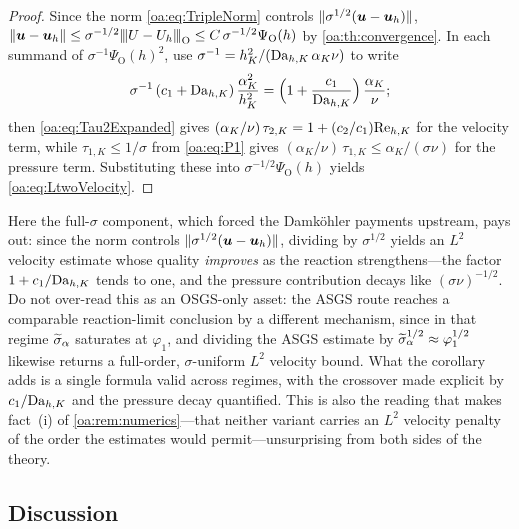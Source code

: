 \begin{proof}
Since the norm \cref{oa:eq:TripleNorm} controls $\lVert \sigma^{1/2}(\boldsymbol{u}-\boldsymbol{u}_h) \rVert$,
$\lVert \boldsymbol{u} - \boldsymbol{u}_h \rVert \le \sigma^{-1/2}{\lvert\kern-0.25ex\lvert\kern-0.25ex\lvert U - U_h \rvert\kern-0.25ex\rvert\kern-0.25ex\rvert}_{\mathrm{O}} \le
C\,\sigma^{-1/2}\Psi_{\mathrm O}(h)$ by \cref{oa:th:convergence}. In each summand of
$\sigma^{-1}\Psi_{\mathrm O}(h)^2$, use $\sigma^{-1} = h_K^2/(\mathrm{Da}_{h,K}\,\alpha_K\nu)$ to write
\[
  \sigma^{-1}\,(c_1+\mathrm{Da}_{h,K})\,\frac{\alpha_K^2}{h_K^2}
  = \Bigl(1 + \frac{c_1}{\mathrm{Da}_{h,K}}\Bigr)\,\frac{\alpha_K}{\nu};
\]
then \cref{oa:eq:Tau2Expanded} gives $(\alpha_K/\nu)\,\tau_{2,K} = 1 + (c_2/c_1)\mathrm{Re}_{h,K}$ for the
velocity term, while $\tau_{1,K} \le 1/\sigma$ from \cref{oa:eq:P1} gives
$(\alpha_K/\nu)\,\tau_{1,K} \le \alpha_K/(\sigma\nu)$ for the pressure term. Substituting
these into $\sigma^{-1/2}\Psi_{\mathrm O}(h)$ yields \cref{oa:eq:LtwoVelocity}. \qedhere
\end{proof}

\begin{pedagogy}
Here the full-$\sigma$ component, which forced the Damk\"ohler payments
upstream, pays out: since the norm controls $\lVert \sigma^{1/2}(\boldsymbol{u}-\boldsymbol{u}_h) \rVert$,
dividing by $\sigma^{1/2}$ yields an $L^2$ velocity estimate whose quality
\emph{improves} as the reaction strengthens---the factor $1 + c_1/\mathrm{Da}_{h,K}$ tends
to one, and the pressure contribution decays like $(\sigma\nu)^{-1/2}$. Do not
over-read this as an OSGS-only asset: the ASGS route reaches a comparable
reaction-limit conclusion by a different mechanism, since in that regime
$\widetilde{\sigma}_{\alpha}$ saturates at $\varphi_1$, and dividing the ASGS estimate by
$\widetilde{\sigma}_{\alpha}^{1/2} \approx \varphi_1^{1/2}$ likewise returns a full-order,
$\sigma$-uniform $L^2$ velocity bound. What the corollary adds is a single
formula valid across regimes, with the crossover made explicit by $c_1/\mathrm{Da}_{h,K}$
and the pressure decay quantified. This is also the reading that makes
fact~(i) of \cref{oa:rem:numerics}---that neither variant carries an $L^2$ velocity penalty of
the order the estimates would permit---unsurprising from both sides of the theory.
\end{pedagogy}

\subsection{Discussion}
\label{oa:sec:discussion}

